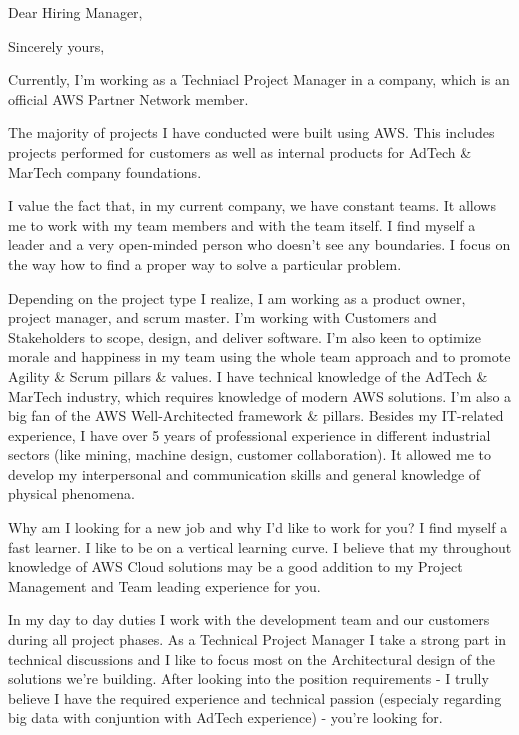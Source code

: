 \documentclass[11pt,a4paper,sans]{moderncv} %
\begin{document}
\date{\today} %
\opening{Dear Hiring Manager,}
\closing{Sincerely yours,} %

\makelettertitle %

Currently, I'm working as a Techniacl Project Manager in a company, which is an official AWS Partner Network member.

The majority of projects I have conducted were built using AWS. This includes projects performed for customers as well as internal products for AdTech \& MarTech company foundations.

I value the fact that, in my current company, we have constant teams. It allows me to work with my team members and with the team itself. I find myself a leader and a very open-minded person who doesn't see any boundaries. I focus on the way how to find a proper way to solve a particular problem.

Depending on the project type I realize, I am working as a product owner, project manager, and scrum master. I'm working with Customers and Stakeholders to scope, design, and deliver software. I'm also keen to optimize morale and happiness in my team using the whole team approach and to promote Agility \& Scrum pillars \& values. I have technical knowledge of the AdTech \& MarTech industry, which requires knowledge of modern AWS solutions. I'm also a big fan of the AWS Well-Architected framework \& pillars.
Besides my IT-related experience, I have over 5 years of professional experience in different industrial sectors (like mining, machine design, customer collaboration). It allowed me to develop my interpersonal and communication skills and general knowledge of physical phenomena.

Why am I looking for a new job and why I'd like to work for you? I find myself a fast learner. I like to be on a vertical learning curve. I believe that my throughout knowledge of AWS Cloud solutions may be a good addition to my Project Management and Team leading experience for you.

In my day to day duties I work with the development team and our customers during all project phases. As a Technical Project Manager I take a strong part in technical discussions and I like to focus most on the Architectural design of the solutions we're building.
After looking into the position requirements - I trully believe I have the required experience and technical passion (especialy regarding big data with conjuntion with AdTech experience) - you're looking for.
\end{document}
